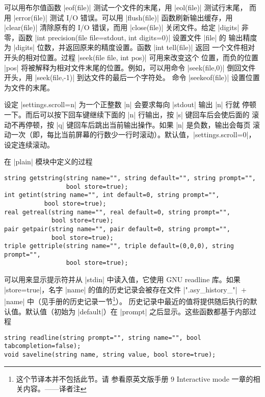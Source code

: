 \documentclass[nofonts,CJKnormalspaces]{ctexbook}[2009/05/20]
\newcommand*\prgname[1]{\textsf{#1}}
\newcommand\transnote[1]{\footnote{#1——译者注}}
\begin{document}
可以用布尔值函数 |eof(file)| 测试一个文件的末尾，用 |eol(file)| 测试行末尾，
而用 |error(file)| 测试 I/O 错误。可以用 |flush(file)| 函数刷新输出缓存，用
|clear(file)| 清除原有的 I/O 错误，而用 |close(file)| 关闭文件。给定 |digits|
非零，函数 |int precision(file file=stdout, int digits=0)| 设置文件 |file| 的
输出精度为 |digits| 位数，并返回原来的精度设置。函数 |int tell(file)| 返回
一个文件相对开头的相对位置。过程 |seek(file file, int pos)| 可用来改变这个
位置，而负的位置 |pos| 将被解释为相对文件末尾的位置。例如，可以用命令
|seek(file,0)| 倒回文件开头，用 |seek(file,-1)| 到达文件的最后一个字符处。
命令 |seekeof(file)| 设置位置为文件的末尾。

设定 |settings.scroll=n| 为一个正整数 |n| 会要求每向 |stdout| 输出 |n| 行就
停顿一下。而后可以按下回车键继续下面的 |n| 行输出，按 |s| 键回车后会使后面的
滚动不再停顿，按 |q| 键回车后跳出当前输出操作。如果 |n| 是负数，输出会每页
滚动一次（即，每比当前屏幕的行数少一行时滚动）。默认值，|settings.scroll=0|，
设定连续滚动。

在 |plain| 模块中定义的过程
\begin{lstlisting}
string getstring(string name="", string default="", string prompt="",
                 bool store=true);
int getint(string name="", int default=0, string prompt="",
           bool store=true);
real getreal(string name="", real default=0, string prompt="",
             bool store=true);
pair getpair(string name="", pair default=0, string prompt="",
             bool store=true);
triple gettriple(string name="", triple default=(0,0,0), string prompt="",
                 bool store=true);
\end{lstlisting}
可以用来显示提示符并从 |stdin| 中读入值，它使用 GNU \prgname{readline} 库。如果
|store=true|，名字 |name| 的值的历史记录会被存在文件 |".asy_history_"|%
${}+{}$|name| 中（见手册的历史记录一节\transnote{这个节译本并不包括此节。请
参看原英文版手册 9 Interactive mode 一章的相关内容。}）。
历史记录中最近的值将提供随后执行的默认值。默认值（初始为 |default|）在
|prompt| 之后显示。这些函数都基于内部过程
\begin{lstlisting}
string readline(string prompt="", string name="", bool tabcompletion=false);
void saveline(string name, string value, bool store=true);
\end{lstlisting}
\end{document}

